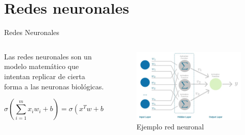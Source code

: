 \documentclass[
  11,
  ignorenonframetext,
  aspectratio=169,
  xcolor=table,
]{beamer}
\begin{document}
\section{Redes neuronales}
\begin{frame}{Redes Neuronales}
  \protect\hypertarget{redes-neuronales}{}
  \begin{columns}[T]
    \begin{column}{0.48\textwidth}
      Las redes neuronales son un modelo matemático que intentan replicar de
      cierta forma a las neuronas biológicas.

      \begin{equation}
        \sigma (\sum_{i=1}^m x_i w_i + b) = \sigma(x^T w + b) = \hat{y}
      \end{equation}
    \end{column}

    \begin{column}{0.48\textwidth}
      \begin{figure}
        \centering
        \includegraphics{images/network.png}
        \caption{Ejemplo red neuronal \cite{bento-2022}}
      \end{figure}
    \end{column}
  \end{columns}
\end{frame}
\end{document}
